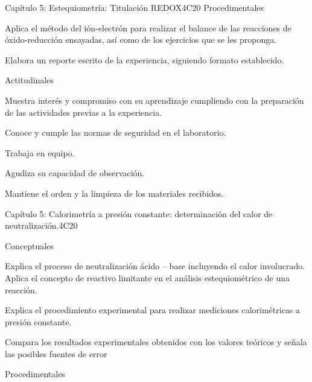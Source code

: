 \begin{syllabus}
\begin{unit}{Capítulo 5:  Estequiometría: Titulación REDOX}{}{}{4}{C20}
   Procedimentales

\begin{topics}
      \item Aplica el método del ión-electrón para realizar el balance de las reacciones de óxido-reducción ensayadas, así como de los ejercicios que se les proponga.
      \item Elabora un reporte escrito de la experiencia, siguiendo formato establecido.
   \end{topics}
   
   Actitudinales

\begin{topics}
      \item Muestra interés y compromiso con su aprendizaje cumpliendo con la preparación de las actividades previas a la experiencia.
      \item Conoce y cumple las normas de seguridad en el laboratorio.
      \item Trabaja en equipo.
      \item Agudiza su capacidad de observación.
     \item Mantiene el orden y la limpieza de los materiales recibidos.
   \end{topics}

   \begin{learningoutcomes}
      \item 
   \end{learningoutcomes}
   
\end{unit}

\begin{unit}{Capítulo 5:  Calorimetría a presión constante: determinación del calor de neutralización.}{}{}{4}{C20}

Conceptuales

\begin{topics}
      \item  Explica el proceso de neutralización ácido – base incluyendo el calor involucrado.
   Aplica el concepto de reactivo limitante en el análisis estequiométrico de una reacción.
	\item Explica el procedimiento experimental para realizar mediciones calorimétricas a presión constante.
	\item Compara los resultados experimentales obtenidos con los valores teóricos y señala las posibles fuentes de error 
   \end{topics}
   
   Procedimentales


\end{unit}
\end{syllabus}
